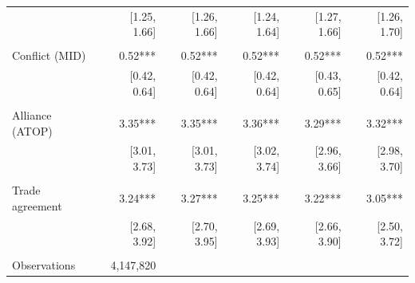 \begin{table}[!h]
\begin{tabular}{llllll}
\multicolumn{1}{l}{} &
  \multicolumn{1}{|r}{[1.25,    1.66]} &
  \multicolumn{1}{r}{[1.26,    1.66]} &
  \multicolumn{1}{r}{[1.24,    1.64]} &
  \multicolumn{1}{r}{[1.27,    1.66]} &
  \multicolumn{1}{r}{[1.26,    1.70]} \\
\multicolumn{1}{l}{} &
  \multicolumn{1}{|r}{} &
  \multicolumn{1}{r}{} &
  \multicolumn{1}{r}{} &
  \multicolumn{1}{r}{} &
  \multicolumn{1}{r}{} \\
\multicolumn{1}{l}{Conflict (MID)} &
  \multicolumn{1}{|r}{0.52***} &
  \multicolumn{1}{r}{0.52***} &
  \multicolumn{1}{r}{0.52***} &
  \multicolumn{1}{r}{0.52***} &
  \multicolumn{1}{r}{0.52***} \\
\multicolumn{1}{l}{} &
  \multicolumn{1}{|r}{[0.42,    0.64]} &
  \multicolumn{1}{r}{[0.42,    0.64]} &
  \multicolumn{1}{r}{[0.42,    0.64]} &
  \multicolumn{1}{r}{[0.43,    0.65]} &
  \multicolumn{1}{r}{[0.42,    0.64]} \\
\multicolumn{1}{l}{} &
  \multicolumn{1}{|r}{} &
  \multicolumn{1}{r}{} &
  \multicolumn{1}{r}{} &
  \multicolumn{1}{r}{} &
  \multicolumn{1}{r}{} \\
\multicolumn{1}{l}{Alliance (ATOP)} &
  \multicolumn{1}{|r}{3.35***} &
  \multicolumn{1}{r}{3.35***} &
  \multicolumn{1}{r}{3.36***} &
  \multicolumn{1}{r}{3.29***} &
  \multicolumn{1}{r}{3.32***} \\
\multicolumn{1}{l}{} &
  \multicolumn{1}{|r}{[3.01,    3.73]} &
  \multicolumn{1}{r}{[3.01,    3.73]} &
  \multicolumn{1}{r}{[3.02,    3.74]} &
  \multicolumn{1}{r}{[2.96,    3.66]} &
  \multicolumn{1}{r}{[2.98,    3.70]} \\
\multicolumn{1}{l}{} &
  \multicolumn{1}{|r}{} &
  \multicolumn{1}{r}{} &
  \multicolumn{1}{r}{} &
  \multicolumn{1}{r}{} &
  \multicolumn{1}{r}{} \\
\multicolumn{1}{l}{Trade agreement} &
  \multicolumn{1}{|r}{3.24***} &
  \multicolumn{1}{r}{3.27***} &
  \multicolumn{1}{r}{3.25***} &
  \multicolumn{1}{r}{3.22***} &
  \multicolumn{1}{r}{3.05***} \\
\multicolumn{1}{l}{} &
  \multicolumn{1}{|r}{[2.68,    3.92]} &
  \multicolumn{1}{r}{[2.70,    3.95]} &
  \multicolumn{1}{r}{[2.69,    3.93]} &
  \multicolumn{1}{r}{[2.66,    3.90]} &
  \multicolumn{1}{r}{[2.50,    3.72]} \\
\multicolumn{1}{l}{} &
  \multicolumn{1}{|r}{} &
  \multicolumn{1}{r}{} &
  \multicolumn{1}{r}{} &
  \multicolumn{1}{r}{} &
  \multicolumn{1}{r}{} \\
\multicolumn{1}{l}{Observations} &
  \multicolumn{1}{|r}{4,147,820} &

\end{tabular}
\end{table}
